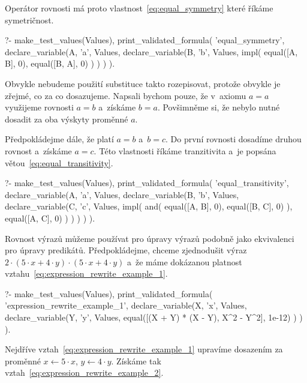 Operátor rovnosti má proto vlastnost~\eqref{eq:equal_symmetry} které říkáme symetričnost.

\begin{fact}
\begin{prolog}
?- 	make_test_values(Values),
	print_validated_formula(
		'equal_symmetry',
		declare_variable(A, 'a', Values,
			declare_variable(B, 'b', Values,
				impl(
					equal([A, B], 0),
					equal([B, A], 0)
				)
			)
		)
	).
\end{prolog}
\end{fact}

Obvykle nebudeme použití substituce takto rozepisovat, protože obvykle je zřejmé, co za co dosazujeme. Napsali bychom pouze, že v~axiomu \(a = a\) využijeme rovnosti \(a = b\) a~získáme \(b = a\). Povšimněme si, že nebylo nutné dosadit za oba výskyty proměnné \(a\).

Předpokládejme dále, že platí \(a = b\) a~\(b = c\). Do první rovnosti dosadíme druhou rovnost a~získáme \(a = c\). Této vlastnosti říkáme tranzitivita a~je popsána větou~\eqref{eq:equal_transitivity}.

\begin{fact}
\begin{prolog}
?- 	make_test_values(Values),
	print_validated_formula(
		'equal_transitivity',
		declare_variable(A, 'a', Values,
			declare_variable(B, 'b', Values,
				declare_variable(C, 'c', Values,
					impl(
						and(
							equal([A, B], 0),
							equal([B, C], 0)
						),
						equal([A, C], 0)
					)
				)
			)
		)
	).
\end{prolog}
\end{fact}

Rovnost výrazů můžeme používat pro úpravy výrazů podobně jako ekvivalenci pro úpravy predikátů. Předpokládejme, chceme zjednodušit výraz \(2 \cdot (5 \cdot x + 4 \cdot y) \cdot (5 \cdot x + 4 \cdot y)\) a~že máme dokázanou platnost vztahu~\eqref{eq:expression_rewrite_example_1}.

\begin{prolog}
?- 	make_test_values(Values),
	print_validated_formula(
		'expression_rewrite_example_1',
		declare_variable(X, 'x', Values,
			declare_variable(Y, 'y', Values,
				equal([(X + Y) * (X - Y), X^2 - Y^2], 1e-12)
			)
		)
	).
\end{prolog}

Nejdříve vztah~\ref{eq:expression_rewrite_example_1} upravíme dosazením za proměnné \(x \leftarrow 5 \cdot x\), \(y \leftarrow 4 \cdot y\). Získáme tak vztah~\eqref{eq:expression_rewrite_example_2}.

